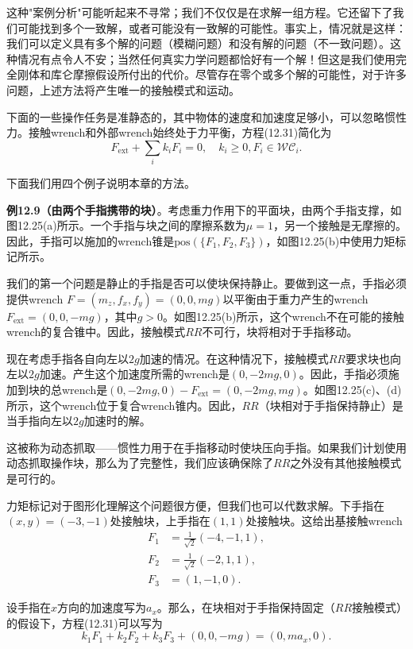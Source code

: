 \documentclass[12pt,a4paper]{article}
\begin{document}
这种"案例分析"可能听起来不寻常；我们不仅仅是在求解一组方程。它还留下了我们可能找到多个一致解，或者可能没有一致解的可能性。事实上，情况就是这样：我们可以定义具有多个解的问题（模糊问题）和没有解的问题（不一致问题）。这种情况有点令人不安；当然任何真实力学问题都恰好有一个解！但这是我们使用完全刚体和库仑摩擦假设所付出的代价。尽管存在零个或多个解的可能性，对于许多问题，上述方法将产生唯一的接触模式和运动。

下面的一些操作任务是准静态的，其中物体的速度和加速度足够小，可以忽略惯性力。接触wrench和外部wrench始终处于力平衡，方程(12.31)简化为
\begin{equation}
F_{\text{ext}} + \sum_i k_i F_i = 0, \quad k_i \geq 0, F_i \in \mathcal{WC}_i.
\label{eq:12.32}
\end{equation}

下面我们用四个例子说明本章的方法。

\textbf{例12.9（由两个手指携带的块）}。考虑重力作用下的平面块，由两个手指支撑，如图12.25(a)所示。一个手指与块之间的摩擦系数为$\mu = 1$，另一个接触是无摩擦的。因此，手指可以施加的wrench锥是$\text{pos}(\{F_1, F_2, F_3\})$，如图12.25(b)中使用力矩标记所示。

我们的第一个问题是静止的手指是否可以使块保持静止。要做到这一点，手指必须提供wrench $F = (m_z, f_x, f_y) = (0, 0, mg)$以平衡由于重力产生的wrench $F_{\text{ext}} = (0, 0, -mg)$，其中$g > 0$。如图12.25(b)所示，这个wrench不在可能的接触wrench的复合锥中。因此，接触模式$RR$不可行，块将相对于手指移动。

现在考虑手指各自向左以$2g$加速的情况。在这种情况下，接触模式$RR$要求块也向左以$2g$加速。产生这个加速度所需的wrench是$(0, -2mg, 0)$。因此，手指必须施加到块的总wrench是$(0, -2mg, 0) - F_{\text{ext}} = (0, -2mg, mg)$。如图12.25(c)、(d)所示，这个wrench位于复合wrench锥内。因此，$RR$（块相对于手指保持静止）是当手指向左以$2g$加速时的解。

这被称为动态抓取——惯性力用于在手指移动时使块压向手指。如果我们计划使用动态抓取操作块，那么为了完整性，我们应该确保除了$RR$之外没有其他接触模式是可行的。

力矩标记对于图形化理解这个问题很方便，但我们也可以代数求解。下手指在$(x, y) = (-3, -1)$处接触块，上手指在$(1, 1)$处接触块。这给出基接触wrench
\begin{align}
F_1 &= \frac{1}{\sqrt{2}}(-4, -1, 1), \\
F_2 &= \frac{1}{\sqrt{2}}(-2, 1, 1), \\
F_3 &= (1, -1, 0).
\end{align}

设手指在$\hat{x}$方向的加速度写为$a_x$。那么，在块相对于手指保持固定（$RR$接触模式）的假设下，方程(12.31)可以写为
\begin{equation}
k_1 F_1 + k_2 F_2 + k_3 F_3 + (0, 0, -mg) = (0, ma_x, 0).
\label{eq:12.33}
\end{equation}
\end{document}
